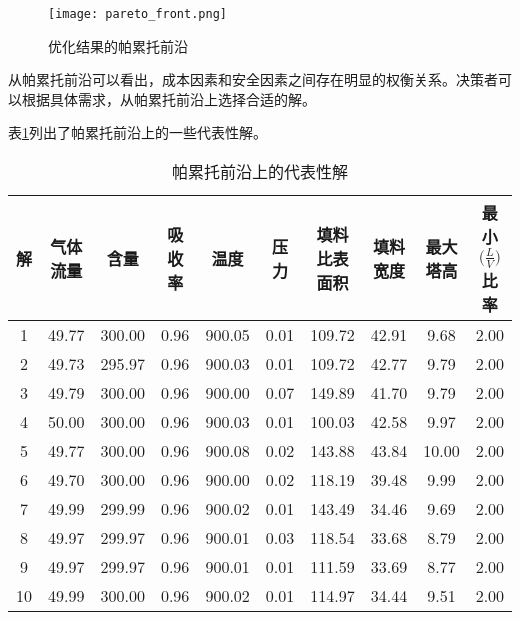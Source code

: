 \begin{figure}[h]
	\centering
	\texttt{[image: pareto\_front.png]}
	\caption{优化结果的帕累托前沿}
	\label{fig:pareto}
\end{figure}

从帕累托前沿可以看出，成本因素和安全因素之间存在明显的权衡关系。决策者可以根据具体需求，从帕累托前沿上选择合适的解。

表\ref{tab:optimal_solutions}列出了帕累托前沿上的一些代表性解。

\begin{table}[h]
	\footnotesize
	\centering
	\caption{帕累托前沿上的代表性解}
	\label{tab:optimal_solutions}
	\begin{tabular}{cccccccccc}
		\hline
		解 & 气体流量 & \ce{SO2}含量 & 吸收率 & 温度 & 压力 & 填料比表面积 & 填料宽度 & 最大塔高 & 最小$\big(\frac{L}{V}\big)$比率 \\
		\hline
		1 & 49.77 & 300.00 & 0.96 & 900.05 & 0.01 & 109.72 & 42.91 & 9.68 & 2.00 \\
		2 & 49.73 & 295.97 & 0.96 & 900.03 & 0.01 & 109.72 & 42.77 & 9.79 & 2.00 \\
		3 & 49.79 & 300.00 & 0.96 & 900.00 & 0.07 & 149.89 & 41.70 & 9.79 & 2.00 \\
		4 & 50.00 & 300.00 & 0.96 & 900.03 & 0.01 & 100.03 & 42.58 & 9.97 & 2.00 \\
		5 & 49.77 & 300.00 & 0.96 & 900.08 & 0.02 & 143.88 & 43.84 & 10.00 & 2.00 \\
		6 & 49.70 & 300.00 & 0.96 & 900.00 & 0.02 & 118.19 & 39.48 & 9.99 & 2.00 \\
		7 & 49.99 & 299.99 & 0.96 & 900.02 & 0.01 & 143.49 & 34.46 & 9.69 & 2.00 \\
		8 & 49.97 & 299.97 & 0.96 & 900.01 & 0.03 & 118.54 & 33.68 & 8.79 & 2.00 \\
		9 & 49.97 & 299.97 & 0.96 & 900.01 & 0.01 & 111.59 & 33.69 & 8.77 & 2.00 \\
		10 & 49.99 & 300.00 & 0.96 & 900.02 & 0.01 & 114.97 & 34.44 & 9.51 & 2.00 \\
		\hline
	\end{tabular}
\end{table}

\clearpage

